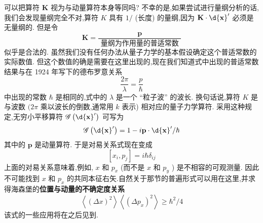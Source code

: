 	可以把算符 $\mathbf{K}$ 视为与动量算符本身等同吗? 不幸的是,如果尝试进行量纲分析的话,我们会发现量纲完全不对,算符 $K$ 具有 $1/$ (长度) 的量纲,因为 $\mathbf{K} \cdot \d{\mathbf{x}}^{\prime }$ 必须是无量纲的. 但是令
	\begin{equation}
		\mathbf{K} = \frac{\mathbf{p}}{\text{ 量纲为作用量的普适常数 }}
	\end{equation}
	似乎是合法的. 虽然我们没有任何办法从量子力学的基本假设确定这个普适常数的实际数值. 但这个数值的确是需要在这里出现的,现在我们知道式中出现的普适常数结果与在 1924 年写下的德布罗意关系
	\begin{equation}
		\frac{2\pi }{\lambda } = \frac{p}{\hbar }
	\end{equation}
	中出现的常数 $\hbar$ 是相同的,式中的 $\lambda$ 是一个 “粒子波” 的波长. 换句话说,算符 $K$ 是与波数 $({2\pi }$ 乘以波长的倒数,通常用 $k$ 表示) 相对应的量子力学算符. 采用这种规定,无穷小平移算符 $\mathscr{G}\left( {\d{\mathbf{x}}^{\prime }}\right)$ 可写为
	\begin{equation}
		\mathscr{G}\left( {\d{\mathbf{x}}^{\prime }}\right) = 1 - i\mathbf{p} \cdot \d{\mathbf{x}}^{\prime }/\hbar
	\end{equation}
	其中的 $\mathbf{p}$ 是动量算符. 于是对易关系式现在变成
	\begin{equation}
		\left\lbrack {{x}_{i},{p}_{j}}\right\rbrack = i\hbar {\delta }_{ij}
	\end{equation}
	上面的对易关系意味着,例如, $x$ 和 ${p}_{x}$ (而不是 $x$ 和 ${p}_{y}$ ) 是不相容的可观测量. 因此不可能找到 $x$ 和 ${p}_{x}$ 的共同本征右矢.自然关于那节的普遍形式可以用在这里,并求得海森堡的\textbf{位置与动量的不确定度关系}
	\begin{equation}
		\left\langle {\left( \Delta x\right) }^{2}\right\rangle \left\langle {\left( \Delta {p}_{x}\right) }^{2}\right\rangle \geq {\hbar }^{2}/4
	\end{equation}
	该式的一些应用将在之后见到.
	
